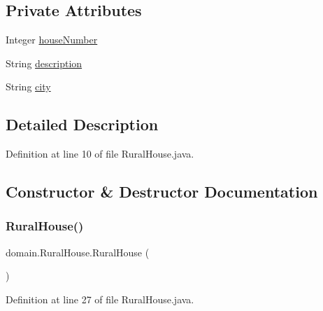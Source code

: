 \subsection*{Private Attributes}
\begin{DoxyCompactItemize}
\item 
Integer \mbox{\hyperlink{classdomain_1_1RuralHouse_a1168b2c788d2f3bca3c54eee3b8734cb}{house\+Number}}
\item 
String \mbox{\hyperlink{classdomain_1_1RuralHouse_afdc9d7b70bcc6baa94cae033a5684f0e}{description}}
\item 
String \mbox{\hyperlink{classdomain_1_1RuralHouse_a4ac1bd1de58f97487abbcb8dc27a8077}{city}}
\end{DoxyCompactItemize}


\subsection{Detailed Description}


Definition at line 10 of file Rural\+House.\+java.



\subsection{Constructor \& Destructor Documentation}
\mbox{\label{classdomain_1_1RuralHouse_a5e1f42ad6b3992bfc5fdece628455552}} 
\subsubsection{\texorpdfstring{RuralHouse()}{RuralHouse()}\hspace{0.1cm}{\footnotesize\ttfamily [1/2]}}
{\footnotesize\ttfamily domain.\+Rural\+House.\+Rural\+House (\begin{DoxyParamCaption}{ }\end{DoxyParamCaption})}



Definition at line 27 of file Rural\+House.\+java.


\begin{DoxyCode}{0}

\end{DoxyCode}


